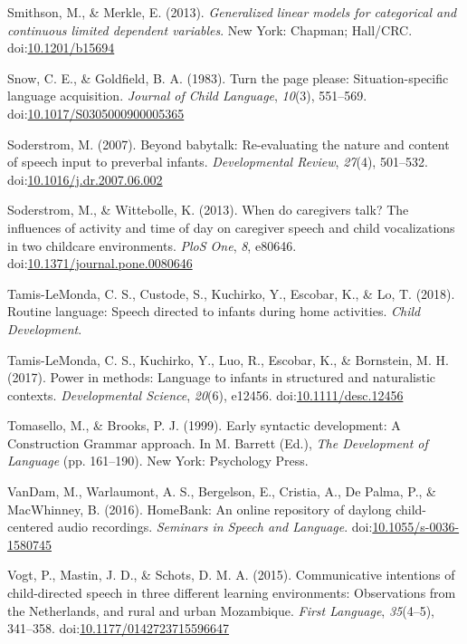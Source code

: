 \documentclass[floatsintext,man]{apa6}
\theoremstyle{definition}
\theoremstyle{definition}
\theoremstyle{definition}
\theoremstyle{remark}
\begin{document}
\hypertarget{ref-smithson2013generalized}{}
Smithson, M., \& Merkle, E. (2013). \emph{Generalized linear models for
categorical and continuous limited dependent variables}. New York:
Chapman; Hall/CRC.
doi:\href{https://doi.org/10.1201/b15694}{10.1201/b15694}

\hypertarget{ref-snow1983turn}{}
Snow, C. E., \& Goldfield, B. A. (1983). Turn the page please:
Situation-specific language acquisition. \emph{Journal of Child
Language}, \emph{10}(3), 551--569.
doi:\href{https://doi.org/10.1017/S0305000900005365}{10.1017/S0305000900005365}

\hypertarget{ref-soderstrom2007beyond}{}
Soderstrom, M. (2007). Beyond babytalk: Re-evaluating the nature and
content of speech input to preverbal infants. \emph{Developmental
Review}, \emph{27}(4), 501--532.
doi:\href{https://doi.org/10.1016/j.dr.2007.06.002}{10.1016/j.dr.2007.06.002}

\hypertarget{ref-soderstrom2013when}{}
Soderstrom, M., \& Wittebolle, K. (2013). When do caregivers talk? The
influences of activity and time of day on caregiver speech and child
vocalizations in two childcare environments. \emph{PloS One}, \emph{8},
e80646.
doi:\href{https://doi.org/10.1371/journal.pone.0080646}{10.1371/journal.pone.0080646}

\hypertarget{ref-tamis2018routine}{}
Tamis-LeMonda, C. S., Custode, S., Kuchirko, Y., Escobar, K., \& Lo, T.
(2018). Routine language: Speech directed to infants during home
activities. \emph{Child Development}.

\hypertarget{ref-tamislemonda2017power}{}
Tamis-LeMonda, C. S., Kuchirko, Y., Luo, R., Escobar, K., \& Bornstein,
M. H. (2017). Power in methods: Language to infants in structured and
naturalistic contexts. \emph{Developmental Science}, \emph{20}(6),
e12456.
doi:\href{https://doi.org/10.1111/desc.12456}{10.1111/desc.12456}

\hypertarget{ref-tomasello1999early}{}
Tomasello, M., \& Brooks, P. J. (1999). Early syntactic development: A
Construction Grammar approach. In M. Barrett (Ed.), \emph{The
Development of Language} (pp. 161--190). New York: Psychology Press.

\hypertarget{ref-HomeBank}{}
VanDam, M., Warlaumont, A. S., Bergelson, E., Cristia, A., De Palma, P.,
\& MacWhinney, B. (2016). HomeBank: An online repository of daylong
child-centered audio recordings. \emph{Seminars in Speech and Language}.
doi:\href{https://doi.org/10.1055/s-0036-1580745}{10.1055/s-0036-1580745}

\hypertarget{ref-vogt2015communicative}{}
Vogt, P., Mastin, J. D., \& Schots, D. M. A. (2015). Communicative
intentions of child-directed speech in three different learning
environments: Observations from the Netherlands, and rural and urban
Mozambique. \emph{First Language}, \emph{35}(4--5), 341--358.
doi:\href{https://doi.org/10.1177/0142723715596647}{10.1177/0142723715596647}
\end{document}

